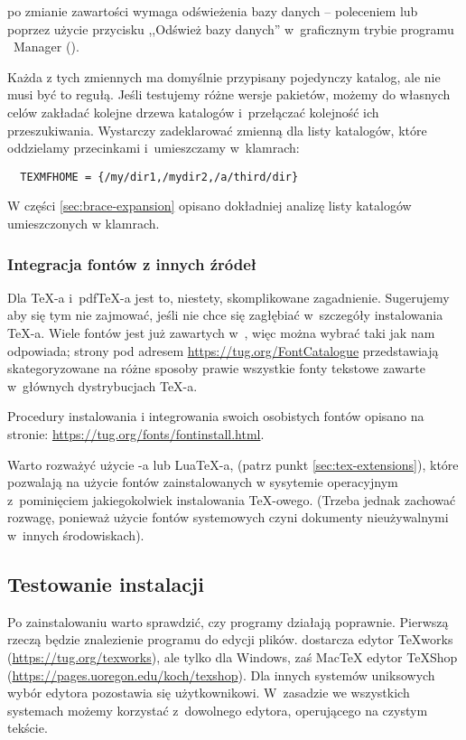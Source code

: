 \documentclass{article}
\begin{document}
 po zmianie zawartości wymaga odświeżenia bazy danych --
poleceniem  lub poprzez użycie przycisku ,,Odśwież bazy
danych'' w~graficznym trybie programu \TL\  Manager \GUI ().

Każda z tych zmiennych ma domyślnie przypisany pojedynczy katalog, ale
nie musi być to regułą. Jeśli testujemy różne wersje pakietów, możemy
do własnych celów zakładać kolejne drzewa katalogów i~przełączać kolejność
ich przeszukiwania. Wystarczy zadeklarować zmienną 
dla listy katalogów, które oddzielamy przecinkami i~umieszczamy w~klamrach:

\begin{verbatim}
  TEXMFHOME = {/my/dir1,/mydir2,/a/third/dir}
\end{verbatim}

W części \ref{sec:brace-expansion} opisano dokładniej analizę listy
katalogów umieszczonych w klamrach.


\subsubsection{Integracja fontów z innych źródeł}

Dla \TeX-a i~pdf\TeX-a jest to, niestety, skomplikowane zagadnienie. Sugerujemy
aby się tym nie zajmować, jeśli nie chce się zagłębiać w~szczegóły instalowania \TeX-a.
Wiele fontów jest już zawartych w~\TL, więc można wybrać taki jak nam odpowiada; strony pod adresem
\url{https://tug.org/FontCatalogue} przedstawiają skategoryzowane na różne sposoby prawie
wszystkie fonty tekstowe zawarte w~głównych dystrybucjach \TeX-a.

Procedury instalowania i integrowania swoich osobistych fontów opisano na stronie:
\url{https://tug.org/fonts/fontinstall.html}.

Warto rozważyć użycie \XeTeX-a lub Lua\TeX-a, (patrz punkt \ref{sec:tex-extensions}),
które pozwalają na użycie fontów zainstalowanych w sysytemie operacyjnym z~pominięciem
jakiegokolwiek instalowania \TeX-owego. (Trzeba jednak zachować rozwagę,
ponieważ użycie fontów systemowych czyni dokumenty nieużywalnymi w~innych środowiskach).

\subsection{Testowanie instalacji}
\label{sec:test-install}

Po zainstalowaniu \TL{} warto sprawdzić, czy programy działają
poprawnie. Pierwszą rzeczą będzie znalezienie programu do edycji plików.
\TL{} dostarcza edytor \TeX{}works (\url{https://tug.org/texworks}), ale tylko
dla Windows, zaś Mac\TeX{} edytor
TeXShop (\url{https://pages.uoregon.edu/koch/texshop}).
Dla innych systemów uniksowych
wybór edytora pozostawia się  użytkownikowi. W~zasadzie we wszystkich
systemach możemy korzystać z~dowolnego edytora, operującego na czystym
tekście.
\end{document}
